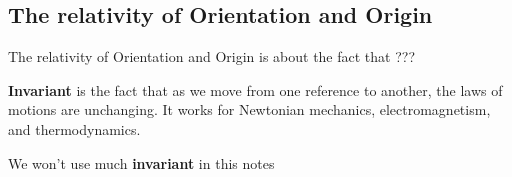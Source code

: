 \subsection{The relativity of Orientation and Origin}

The relativity of Orientation and Origin is about the fact that ??? 

\textbf{Invariant} is the fact that as we move from one reference to another, the laws of motions are unchanging. It works for Newtonian mechanics, electromagnetism, and thermodynamics.

We won't use much \textbf{invariant} in this notes